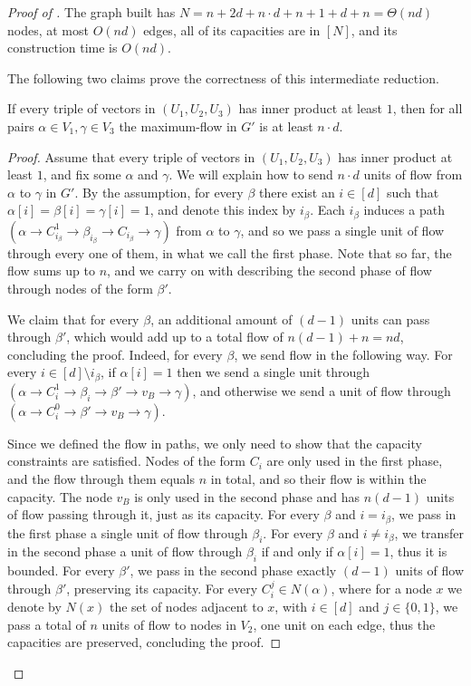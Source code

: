 \documentclass{toc}
\theoremstyle{plain}
\begin{document}
\begin{proof}[Proof of ]
The graph built has $N=n+2d+n\cdot d+n+1+d+n=\Theta(nd)$ nodes, at most $O(nd)$ edges, all of its capacities are in $[N]$, and its construction time is $O(nd)$.

\medskip
The following two claims
prove the correctness of this intermediate reduction.

\begin{claim}\label{claim:simple}
If every triple of vectors in $(U_1, U_2, U_3)$ has inner product at least $1$, then for all pairs $\alpha \in V_1,\gamma \in V_3$ the maximum-flow in $G'$ is at least $n\cdot d$.
\end{claim}

\begin{proof}
Assume that every triple of vectors in $(U_1, U_2, U_3)$ has inner product at least $1$, and fix some $\alpha$ and $\gamma$.
We will explain how to send $n\cdot d$ units of flow from $\alpha$ to $\gamma$ in $G'$.
By the assumption, for every $\beta$ there exist an $i\in [d]$ such that $\alpha[i]=\beta[i]=\gamma[i]=1$, and denote this index by $i_{\beta}$.
Each $i_{\beta}$ induces a path $(\alpha\rightarrow C_{i_{\beta}}^1\rightarrow\beta_{i_{\beta}}\rightarrow C_{i_{\beta}}\rightarrow \gamma)$ from $\alpha$ to $\gamma$, and so we pass a single unit of flow through every one of them, in what we call the first phase. Note that so far, the flow sums up to $n$, and we carry on with describing the second phase of flow through nodes of the form $\beta'$.

We claim that for every $\beta$, an additional amount of $(d-1)$ units can pass through $\beta'$, which would add up to a total flow of $n(d-1)+n=nd$, concluding the proof. Indeed, for every $\beta$, we send flow in the following way. For every $i\in [d]\setminus i_{\beta}$, if $\alpha[i]=1$ then we send a single unit through $(\alpha\rightarrow C_i^1\rightarrow \beta_i\rightarrow \beta' \rightarrow  v_B\rightarrow \gamma)$, and otherwise we send a unit of flow through $(\alpha\rightarrow C_i^0\rightarrow \beta'\rightarrow v_B\rightarrow \gamma)$.

Since we defined the flow in paths, we only need to show that the capacity constraints are satisfied. Nodes of the form $C_i$ are only used in the first phase, and the flow through them equals $n$ in total, and so their flow is within the capacity. The node $v_B$ is only used in the second phase and has $n(d-1)$ units of flow passing through it, just as its capacity.
For every $\beta$ and $i=i_{\beta}$, we pass in the first phase a single unit of flow through $\beta_i$. For every $\beta$ and $i\neq i_{\beta}$, we transfer in the second phase a unit of flow through $\beta_i$ if and only if $\alpha[i]=1$, thus it is bounded. For every $\beta'$, we pass in the second phase exactly $(d-1)$ units of flow through $\beta'$, preserving its capacity. For every $C_i^j\in N(\alpha)$,
where for a node $x$ we denote by $N(x)$ the set of nodes adjacent to $x$,
with $i\in [d]$ and $j\in \{0,1\}$, we pass a total of $n$ units of flow to nodes in $V_2$, one unit on each edge, thus the capacities are preserved, concluding the proof.
\end{proof}


\end{proof}
\end{document}
